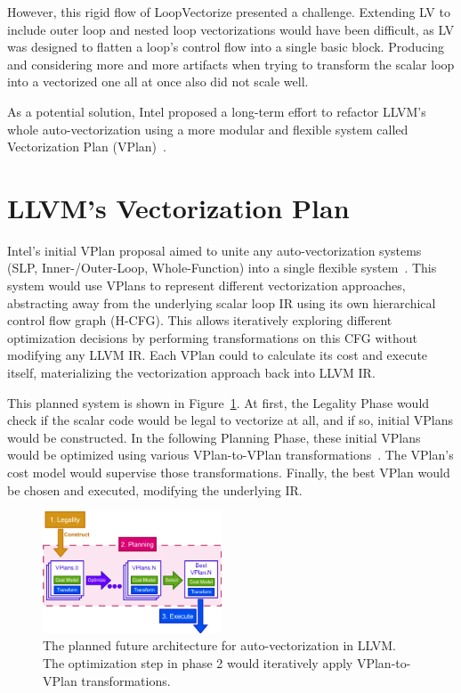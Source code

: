 \documentclass[sigplan,11pt,nonacm]{acmart}
\begin{document}
However, this rigid flow of LoopVectorize presented a challenge. Extending LV to include outer loop 
and nested loop vectorizations would have been difficult, as LV was designed to flatten a
loop's control flow into a single basic block. Producing and considering more and 
more artifacts when trying to transform the scalar loop into a vectorized one all at once also did 
not scale well.

As a potential solution, Intel proposed a long-term effort to refactor LLVM's whole auto-vectorization
using a more modular and flexible system called Vectorization Plan (VPlan)~\cite{llvmextloopvec}.




\section{LLVM's Vectorization Plan}
\label{sec:vplan}

Intel's initial VPlan proposal aimed to unite any 
auto-vectorization systems (SLP, Inner-/Outer-Loop, Whole-Function) into a 
single flexible system~\cite{llvmextloopvec,llvmintrvplan,llvmvplanstate}. 
This system would use VPlans to represent different 
vectorization approaches, abstracting away from the underlying scalar loop IR using its own 
hierarchical control flow graph (H-CFG). This allows iteratively exploring different 
optimization decisions by performing transformations on this CFG without modifying any LLVM IR.
Each VPlan could to calculate its cost and execute itself, materializing the vectorization 
approach back into LLVM IR.

This planned system is shown in Figure~\ref{fig:vplan-future}. At first, the Legality 
Phase would check if the scalar code would be legal to vectorize at all, and if so, 
initial VPlans would be constructed. In the following Planning Phase, these initial 
VPlans would be optimized using various VPlan-to-VPlan transformations~\cite{llvmouterloopstatus}. 
The VPlan's cost model would supervise those transformations. Finally, the best VPlan 
would be chosen and executed, modifying the underlying IR.

\begin{figure}
  \centering
  \includegraphics[width=0.475\textwidth]{images/vplan-future.png}
  \caption{The planned future architecture for auto-vectorization in LLVM. The 
  optimization step in phase 2 would iteratively apply VPlan-to-VPlan transformations.}
  \label{fig:vplan-future}
\end{figure}
\end{document}
